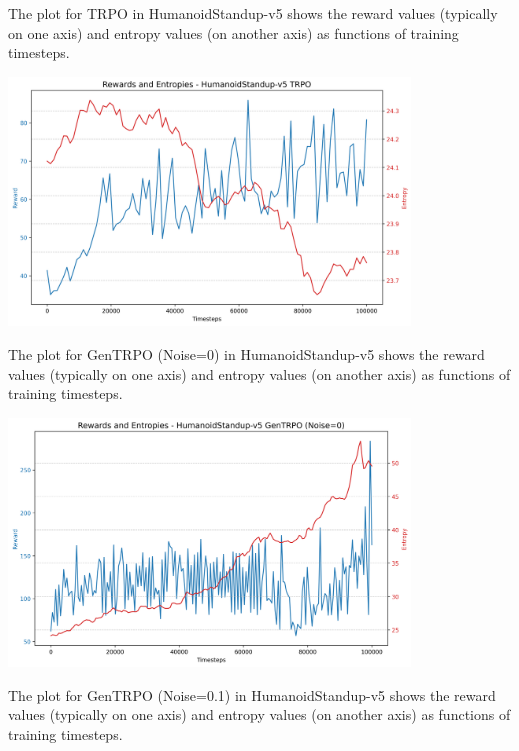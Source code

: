 \documentclass{svproc}
\begin{document}
The plot for TRPO in HumanoidStandup-v5 shows the reward values (typically on one axis) and entropy values (on another axis) as functions of training timesteps.

\begin{center}
\includegraphics[width=0.8\textwidth]{graph_HumanoidStandup-v5_trpo_rewards_entropies.png}
\end{center}

The plot for GenTRPO (Noise=0) in HumanoidStandup-v5 shows the reward values (typically on one axis) and entropy values (on another axis) as functions of training timesteps.

\begin{center}
\includegraphics[width=0.8\textwidth]{graph_HumanoidStandup-v5_gentrpo_rewards_entropies.png}
\end{center}

The plot for GenTRPO (Noise=0.1) in HumanoidStandup-v5 shows the reward values (typically on one axis) and entropy values (on another axis) as functions of training timesteps.
\end{document}
